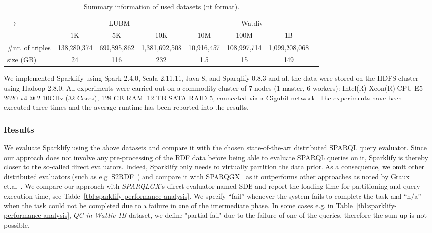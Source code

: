 \begin{table}
\centering
\begin{tabularx}{\textwidth}{Xccccccc}	
\toprule
\multirow{2}{*}{$\longrightarrow$} & \multicolumn{3}{c|}{LUBM} & \multicolumn{4}{c}{Watdiv} \\
\cline{2-8}  \rule{0pt}{10pt}
&   \scriptsize{1K} & \scriptsize{5K} & \scriptsize{10K}  & \scriptsize{10M} &\scriptsize{100M} &\scriptsize{1B} &\\
\midrule
\scriptsize{\#nr. of triples}& \scriptsize{138,280,374} & \scriptsize{690,895,862} & \scriptsize{1,381,692,508} & \scriptsize{10,916,457} & \scriptsize{108,997,714} & \scriptsize{1,099,208,068} &  \\
\scriptsize{size (GB)}  & \scriptsize{24} & \scriptsize{116} & \scriptsize{232} & \scriptsize{1.5} &\scriptsize{15} &\scriptsize{149} &\\
\bottomrule
\end{tabularx}
{\caption{Summary information of used datasets (nt format).}\label{tab:sparklify-dataset_info}}
\end{table}

We implemented Sparklify using Spark-2.4.0, Scala 2.11.11, Java 8, and Sparqlify 0.8.3 and all the data were stored on the HDFS cluster using Hadoop 2.8.0.
All experiments were carried out on a commodity cluster of 7 nodes (1 master, 6 workers): Intel(R) Xeon(R) CPU E5-2620 v4 @ 2.10GHz (32 Cores), 128 GB RAM, 12 TB SATA RAID-5, connected via a Gigabit network.
The experiments have been executed three times and the average runtime has been reported into the results.

\subsubsection{Results}
We evaluate Sparklify using the above datasets and compare it with the chosen state-of-the-art distributed SPARQL query evaluator.
Since our approach does not involve any pre-processing of the RDF data before being able to evaluate SPARQL queries on it, Sparklify is thereby closer to the so-called direct evaluators.
Indeed, Sparklify only needs to virtually partition the data prior.
As a consequence, we omit other distributed evaluators (such as e.g. S2RDF~\cite{Schatzle:2016:SRQ:2977797.2977806}) and compare it with SPARQGX~\cite{sparqlgx-iswc-2016} as it outperforms other approaches as noted by Graux et.al~\cite{sparqlgx-iswc-2016}.
We compare our approach with \emph{SPARQLGX}'s direct evaluator named SDE and report the loading time for partitioning and query execution time, see Table~\ref{tbl:sparklify-performance-analysis}.
We specify ``fail'' whenever the system fails to complete the task and ``n/a'' when the task could not be completed due to a failure in one of the intermediate phase.
In some cases e.g. in Table~\ref{tbl:sparklify-performance-analysis}, \textit{QC in Watdiv-1B} dataset, we define "partial fail" due to the failure of one of the queries, therefore the sum-up is not possible.

